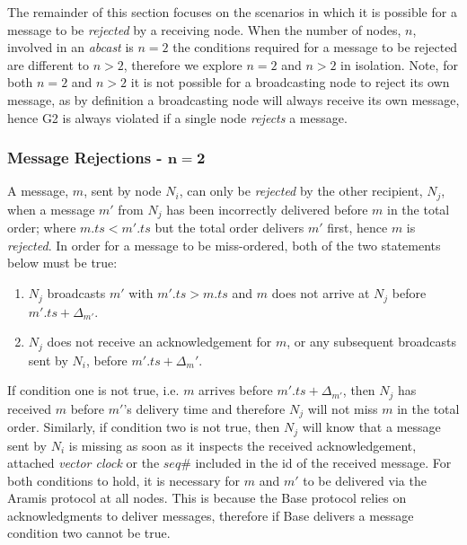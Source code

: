 		The remainder of this section focuses on the scenarios in which it is possible for a message to be \emph{rejected} by a receiving node.  When the number of nodes, $n$, involved in an \emph{abcast} is $n=2$ the conditions required for a message to be rejected are different to $n > 2$, therefore we explore $n=2$ and $n>2$ in isolation. Note, for both $n=2$ and $n>2$ it is not possible for a broadcasting node to reject its own message, as by definition a broadcasting node will always receive its own message, hence G2 is always violated if a single node \emph{rejects} a message.  
		
        \subsubsection*{Message Rejections - $\boldsymbol{n = 2}$}
        A message, $m$, sent by node $N_i$, can only be \emph{rejected} by the other recipient, $N_j$, when a message $m'$ from $N_j$ has been incorrectly delivered before $m$ in the total order; where $m.ts < m'.ts$ but the total order delivers $m'$ first, hence $m$ is \emph{rejected}.  In order for a message to be miss-ordered, both of the two statements below must be true:
        
        \begin{enumerate}
            \item $N_j$ broadcasts $m'$ with $m'.ts > m.ts$ and $m$ does not arrive at $N_j$ before $m'.ts + \Delta_{m'}$.  
            \item $N_j$ does not receive an acknowledgement for $m$, or any subsequent broadcasts sent by $N_i$, before $m'.ts + \Delta_m'$.   
        \end{enumerate}
        
        If condition one is not true, i.e. $m$ arrives before $m'.ts + \Delta_{m'}$, then $N_j$ has received $m$ before $m'$'s delivery time and therefore $N_j$ will not miss $m$ in the total order.  Similarly, if condition two is not true, then $N_j$ will know that a message sent by $N_i$ is missing as soon as it inspects the received acknowledgement, attached \emph{vector clock} or the $seq\#$ included in the id of the received message.  For both conditions to hold, it is necessary for $m$ and $m'$ to be delivered via the \textsf{Aramis} protocol at all nodes.  This is because the \textsf{Base} protocol relies on acknowledgments to deliver messages, therefore if \textsf{Base} delivers a message condition two cannot be true.  
        
